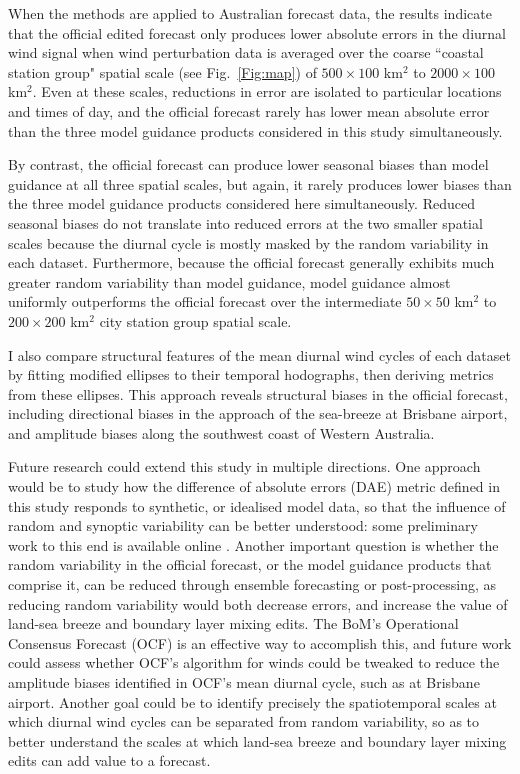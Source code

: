 \documentclass{ametsoc}
\begin{document}
When the methods are applied to Australian forecast data, the results indicate that the official edited forecast only produces lower absolute errors in the diurnal wind signal when wind perturbation data is averaged over the coarse ``coastal station group" spatial scale (see Fig.~\ref{Fig:map}) of $500\times 100$ km$^{2}$ to $2000 \times 100$ km$^{2}$. Even at these scales, reductions in error are isolated to particular locations and times of day, and the official forecast rarely has lower mean absolute error than the three model guidance products considered in this study simultaneously.

By contrast, the official forecast can produce lower seasonal biases than model guidance at all three spatial scales, but again, it rarely produces lower biases than the three model guidance products considered here simultaneously. Reduced seasonal biases do not translate into reduced errors at the two smaller spatial scales because the diurnal cycle is mostly masked by the random variability in each dataset. Furthermore, because the official forecast generally exhibits much greater random variability than model guidance, model guidance almost uniformly outperforms the official forecast over the intermediate $50\times 50$ km$^{2}$ to $200 \times 200$ km$^{2}$ city station group spatial scale.

I also compare structural features of the mean diurnal wind cycles of each dataset by fitting modified ellipses to their temporal hodographs, then deriving metrics from these ellipses. This approach reveals structural biases in the official forecast, including directional biases in the approach of the sea-breeze at Brisbane airport, and amplitude biases along the southwest coast of Western Australia.

Future research could extend this study in multiple directions.  One approach would be to study how the difference of absolute errors (DAE) metric defined in this study responds to synthetic, or idealised model data, so that the influence of random and synoptic variability can be better understood: some preliminary work to this end is available online \citep{short20}. Another important question is whether the random variability in the official forecast, or the model guidance products that comprise it, can be reduced through ensemble forecasting or post-processing, as reducing random variability would both decrease errors, and increase the value of land-sea breeze and boundary layer mixing edits. The BoM's Operational Consensus Forecast (OCF) is an effective way to accomplish this, and future work could assess whether OCF's algorithm for winds could be tweaked to reduce the amplitude biases identified in OCF's mean diurnal cycle, such as at Brisbane airport. Another goal could be to identify precisely the spatiotemporal scales at which diurnal wind cycles can be separated from random variability, so as to better understand the scales at which land-sea breeze and boundary layer mixing edits can add value to a forecast.  
\end{document}
